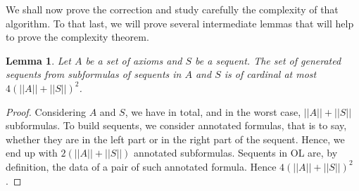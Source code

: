 \documentclass[a4paper, 11pt]{article}
\newtheorem{lemma}[theorem]{Lemma}
\begin{document}
    We shall now prove the correction and study carefully the complexity of that algorithm. To that
    last, we will prove several intermediate lemmas that will help to prove the complexity theorem.
    \begin{lemma}\label{lemma_sequents_cardinal} 
	    Let $A$ be a set of axioms and $S$ be a sequent. The set of generated sequents from
	    subformulas of sequents in $A$ and $S$ is of cardinal at most $4(||A||+||S||)^2$.
    \end{lemma}
    \begin{proof}
	    Considering $A$ and $S$, we have in total, and in the worst case, $||A||+||S||$ subformulas.
	    To build sequents, we consider annotated formulas, that is to say, whether they are in the 
	    left part
	    or in the right part of the sequent. Hence, we end up with $2(||A||+||S||)$ annotated
	    subformulas. Sequents in OL are, by definition, the data of a pair of such annotated
	    formula. Hence $4(||A||+||S||)^2$.
    \end{proof}
\end{document}
